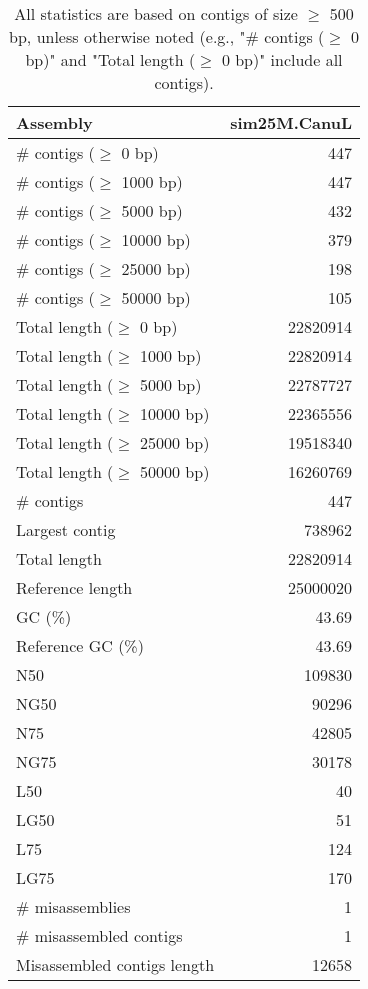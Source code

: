 \documentclass[12pt,a4paper]{article}
\begin{document}
\begin{table}[ht]
\begin{center}
\caption{All statistics are based on contigs of size $\geq$ 500 bp, unless otherwise noted (e.g., "\# contigs ($\geq$ 0 bp)" and "Total length ($\geq$ 0 bp)" include all contigs).}
\begin{tabular}{|l*{1}{|r}|}
\hline
Assembly & sim25M.CanuL \\ \hline
\# contigs ($\geq$ 0 bp) & 447 \\ \hline
\# contigs ($\geq$ 1000 bp) & 447 \\ \hline
\# contigs ($\geq$ 5000 bp) & 432 \\ \hline
\# contigs ($\geq$ 10000 bp) & 379 \\ \hline
\# contigs ($\geq$ 25000 bp) & 198 \\ \hline
\# contigs ($\geq$ 50000 bp) & 105 \\ \hline
Total length ($\geq$ 0 bp) & 22820914 \\ \hline
Total length ($\geq$ 1000 bp) & 22820914 \\ \hline
Total length ($\geq$ 5000 bp) & 22787727 \\ \hline
Total length ($\geq$ 10000 bp) & 22365556 \\ \hline
Total length ($\geq$ 25000 bp) & 19518340 \\ \hline
Total length ($\geq$ 50000 bp) & 16260769 \\ \hline
\# contigs & 447 \\ \hline
Largest contig & 738962 \\ \hline
Total length & 22820914 \\ \hline
Reference length & 25000020 \\ \hline
GC (\%) & 43.69 \\ \hline
Reference GC (\%) & 43.69 \\ \hline
N50 & 109830 \\ \hline
NG50 & 90296 \\ \hline
N75 & 42805 \\ \hline
NG75 & 30178 \\ \hline
L50 & 40 \\ \hline
LG50 & 51 \\ \hline
L75 & 124 \\ \hline
LG75 & 170 \\ \hline
\# misassemblies & 1 \\ \hline
\# misassembled contigs & 1 \\ \hline
Misassembled contigs length & 12658 \\ \hline

\end{tabular}
\end{center}
\end{table}
\end{document}
